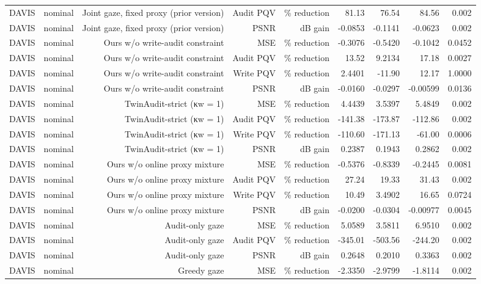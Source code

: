 \begin{table}[t]
\begin{tabular}{llrrrrrrr}
DAVIS & nominal & Joint gaze, fixed proxy (prior version) & Audit PQV & \% reduction & 81.13 & 76.54 & 84.56 & 0.002 \\
DAVIS & nominal & Joint gaze, fixed proxy (prior version) & PSNR & dB gain & -0.0853 & -0.1141 & -0.0623 & 0.002 \\
DAVIS & nominal & Ours w/o write-audit constraint & MSE & \% reduction & -0.3076 & -0.5420 & -0.1042 & 0.0452 \\
DAVIS & nominal & Ours w/o write-audit constraint & Audit PQV & \% reduction & 13.52 & 9.2134 & 17.18 & 0.0027 \\
DAVIS & nominal & Ours w/o write-audit constraint & Write PQV & \% reduction & 2.4401 & -11.90 & 12.17 & 1.0000 \\
DAVIS & nominal & Ours w/o write-audit constraint & PSNR & dB gain & -0.0160 & -0.0297 & -0.00599 & 0.0136 \\
DAVIS & nominal & TwinAudit-strict (κw = 1) & MSE & \% reduction & 4.4439 & 3.5397 & 5.4849 & 0.002 \\
DAVIS & nominal & TwinAudit-strict (κw = 1) & Audit PQV & \% reduction & -141.38 & -173.87 & -112.86 & 0.002 \\
DAVIS & nominal & TwinAudit-strict (κw = 1) & Write PQV & \% reduction & -110.60 & -171.13 & -61.00 & 0.0006 \\
DAVIS & nominal & TwinAudit-strict (κw = 1) & PSNR & dB gain & 0.2387 & 0.1943 & 0.2862 & 0.002 \\
DAVIS & nominal & Ours w/o online proxy mixture & MSE & \% reduction & -0.5376 & -0.8339 & -0.2445 & 0.0081 \\
DAVIS & nominal & Ours w/o online proxy mixture & Audit PQV & \% reduction & 27.24 & 19.33 & 31.43 & 0.002 \\
DAVIS & nominal & Ours w/o online proxy mixture & Write PQV & \% reduction & 10.49 & 3.4902 & 16.65 & 0.0724 \\
DAVIS & nominal & Ours w/o online proxy mixture & PSNR & dB gain & -0.0200 & -0.0304 & -0.00977 & 0.0045 \\
DAVIS & nominal & Audit-only gaze & MSE & \% reduction & 5.0589 & 3.5811 & 6.9510 & 0.002 \\
DAVIS & nominal & Audit-only gaze & Audit PQV & \% reduction & -345.01 & -503.56 & -244.20 & 0.002 \\
DAVIS & nominal & Audit-only gaze & PSNR & dB gain & 0.2648 & 0.2010 & 0.3363 & 0.002 \\
DAVIS & nominal & Greedy gaze & MSE & \% reduction & -2.3350 & -2.9799 & -1.8114 & 0.002 \\

\end{tabular}
\end{table}
